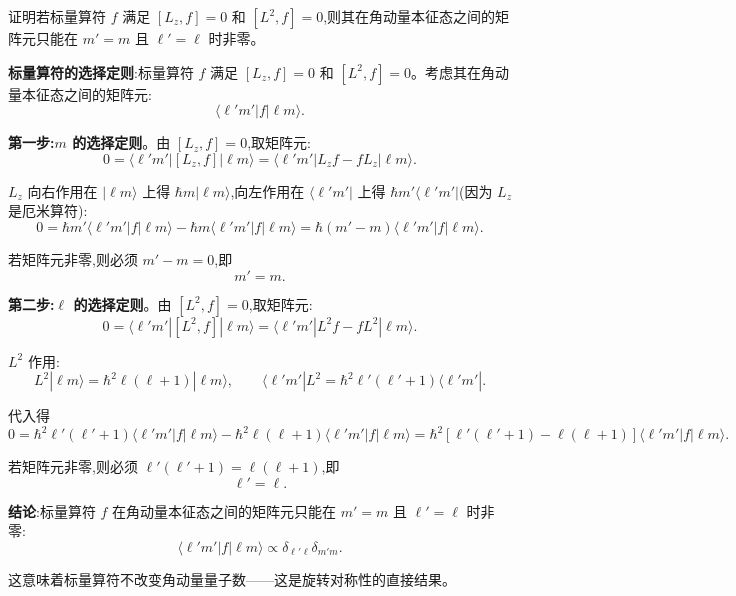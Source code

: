 \begin{question}
证明若标量算符 $f$ 满足 $[L_z,f]=0$ 和 $[L^2,f]=0$,则其在角动量本征态之间的矩阵元只能在 $m'=m$ 且 $\ell'=\ell$ 时非零。
\begin{solution}
	\textbf{标量算符的选择定则}:标量算符 $f$ 满足 $[L_z,f]=0$ 和 $[L^2,f]=0$。考虑其在角动量本征态之间的矩阵元:
	\[
	\langle \ell'm'|f|\ell m\rangle.
	\]

	\textbf{第一步:$m$ 的选择定则}。由 $[L_z,f]=0$,取矩阵元:
	\[
	0 = \langle \ell'm'|[L_z,f]|\ell m\rangle
	= \langle \ell'm'|L_z f - f L_z|\ell m\rangle.
	\]

	$L_z$ 向右作用在 $|\ell m\rangle$ 上得 $\hbar m|\ell m\rangle$,向左作用在 $\langle\ell'm'|$ 上得 $\hbar m'\langle\ell'm'|$(因为 $L_z$ 是厄米算符):
	\[
	0 = \hbar m'\langle\ell'm'|f|\ell m\rangle - \hbar m\langle\ell'm'|f|\ell m\rangle
	= \hbar(m'-m)\langle\ell'm'|f|\ell m\rangle.
	\]

	若矩阵元非零,则必须 $m'-m=0$,即
	\[
	\boxed{m' = m}.
	\]

	\textbf{第二步:$\ell$ 的选择定则}。由 $[L^2,f]=0$,取矩阵元:
	\[
	0 = \langle \ell'm'|[L^2,f]|\ell m\rangle
	= \langle\ell'm'|L^2 f - f L^2|\ell m\rangle.
	\]

	$L^2$ 作用:
	\[
	L^2|\ell m\rangle = \hbar^2\ell(\ell+1)|\ell m\rangle,
	\qquad
	\langle\ell'm'|L^2 = \hbar^2\ell'(\ell'+1)\langle\ell'm'|.
	\]

	代入得
	\[
	0 = \hbar^2\ell'(\ell'+1)\langle\ell'm'|f|\ell m\rangle
	- \hbar^2\ell(\ell+1)\langle\ell'm'|f|\ell m\rangle
	= \hbar^2[\ell'(\ell'+1)-\ell(\ell+1)]\langle\ell'm'|f|\ell m\rangle.
	\]

	若矩阵元非零,则必须 $\ell'(\ell'+1)=\ell(\ell+1)$,即
	\[
	\boxed{\ell' = \ell}.
	\]

	\textbf{结论}:标量算符 $f$ 在角动量本征态之间的矩阵元只能在 $m'=m$ 且 $\ell'=\ell$ 时非零:
	\[
	\boxed{\langle \ell'm'|f|\ell m\rangle \propto \delta_{\ell'\ell}\delta_{m'm}}.
	\]

	这意味着标量算符不改变角动量量子数——这是旋转对称性的直接结果。
	\end{solution}
\end{question}

